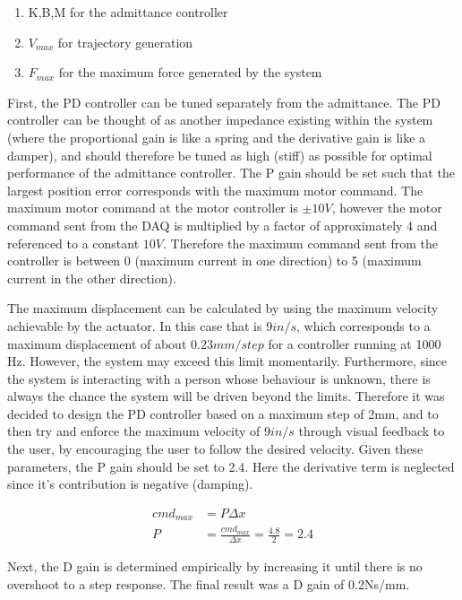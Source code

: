 \documentclass[12pt]{report}
\begin{document}
	\begin{enumerate}
		\item K,B,M for the admittance controller
		\item $V_{max}$ for trajectory generation
		\item $F_{max}$ for the maximum force generated by the system
	\end{enumerate}
	
	
	First, the PD controller can be tuned separately from the admittance. The PD controller can be thought of as another impedance existing within the system (where the proportional gain is like a spring and the derivative gain is like a damper), and should therefore be tuned as high (stiff) as possible for optimal performance of the admittance controller. The P gain should be set such that the largest position error corresponds with the maximum motor command. The maximum motor command at the motor controller is $\pm 10V$, however the motor command sent from the DAQ is multiplied by a factor of approximately 4 and referenced to a constant $10 V$. Therefore the maximum command sent from the controller is between 0 (maximum current in one direction) to 5 (maximum current in the other direction). 
	
	The maximum displacement can be calculated by using the maximum velocity achievable by the actuator. In this case that is $9 in/s$, which corresponds to a maximum displacement of about $0.23 mm/step$ for a controller running at 1000 Hz. However, the system may exceed this limit momentarily. Furthermore, since the system is interacting with a person whose behaviour is unknown, there is always the chance the system will be driven beyond the limits. Therefore it was decided to design the PD controller based on a maximum step of 2mm, and to then try and enforce the maximum velocity of $9 in/s$ through visual feedback to the user, by encouraging the user to follow the desired velocity. Given these parameters, the P gain should be set to 2.4. Here the derivative term is neglected since it's contribution is negative (damping). 
	
	\begin{align*}
		cmd_{max} &= P\Delta x \\
		P &= \frac{cmd_{max}}{\Delta x} = \frac{4.8}{2} =  2.4
	\end{align*}
	
	Next, the D gain is determined empirically by increasing it until there is no overshoot to a step response. The final result was a D gain of 0.2Ns/mm. 
	
\end{document}
